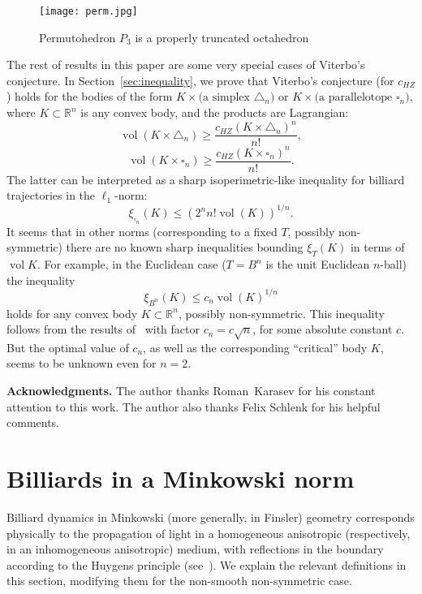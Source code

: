 \documentclass[12pt,a4paper,oneside]{amsart}
\theoremstyle{definition}
\theoremstyle{remark}
\numberwithin{equation}{section}
\DeclareMathOperator{\volu}{vol}
\begin{document}
\begin{figure}[h]
\centering
\texttt{[image: perm.jpg]}
\caption[]{Permutohedron $P_3$ is a properly truncated octahedron\footnotemark}
\label{pic:permutohedron}
\end{figure}


The rest of results in this paper are some very special cases of Viterbo's conjecture. In Section~\ref{sec:inequality}, we prove that Viterbo's conjecture (for $c_{HZ}$) holds for the bodies of the form $K \times \text{(a simplex $\triangle_n$)}$ or $K \times \text{(a parallelotope $\square_n$)}$, where $K \subset \mathbb{R}^n$ is any convex body, and the products are Lagrangian:
$$
\volu (K \times \triangle_n) \ge \frac{c_{HZ}(K \times \triangle_n)^n}{n!},
$$
$$
\volu (K \times \square_n) \ge \frac{c_{HZ}(K \times \square_n)^n}{n!}.
$$
The latter can be interpreted as a sharp isoperimetric-like inequality for billiard trajectories in the $\ell_1$-norm:
$$
\xi_{\square_n}(K) \le \left(2^n n! \volu (K)\right)^{1/n}.
$$
It seems that in other norms (corresponding to a fixed $T$, possibly non-symmetric) there are no known sharp inequalities bounding $\xi_T(K)$ in terms of $\volu K$. For example, in the Euclidean case ($T = B^n$ is the unit Euclidean $n$-ball) the inequality
$$
\xi_{B^n}(K) \le c_n \volu (K) ^{1/n}
$$
holds for any convex body $K \subset \mathbb{R}^n$, possibly non-symmetric. This inequality follows from the results of~\cite{artstein2008m} with factor $c_n = c \sqrt{n}$, for some absolute constant $c$.
But the optimal value of $c_n$, as well as the corresponding ``critical'' body $K$, seems to be unknown even for $n=2$.

\textbf{Acknowledgments.}
The author thanks Roman~Karasev for his constant attention to this work. The author also thanks Felix Schlenk for his helpful comments.

\section{Billiards in a Minkowski norm}
\label{sec:billiard}

Billiard dynamics in Minkowski (more generally, in Finsler) geometry corresponds physically to the propagation of light in a homogeneous anisotropic (respectively, in an inhomogeneous anisotropic) medium, with reflections in the boundary according to the Huygens principle (see~\cite{gutkin2002billiards}). We explain the relevant definitions in this section, modifying them for the non-smooth non-symmetric case.
\end{document}
